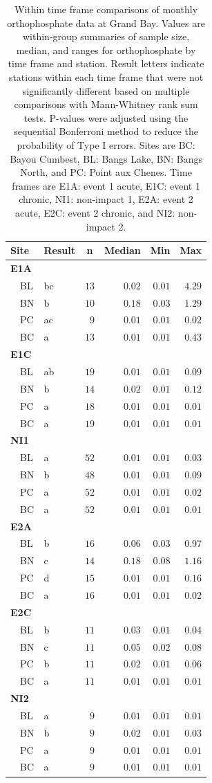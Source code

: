 \documentclass[letterpaper,12pt]{article}\usepackage[]{graphicx}\usepackage[]{color}
\begin{document}
\clearpage

\begin{table}[!tbp]
\caption{Within time frame comparisons of monthly orthophosphate data at Grand Bay.  Values are within-group summaries of sample size, median, and ranges for orthophosphate by time frame and station.  Result letters indicate stations within each time frame that were not significantly different based on multiple comparisons with Mann-Whitney rank sum tests.  P-values were adjusted using the sequential Bonferroni method to reduce the probability of Type I errors. Sites are BC: Bayou Cumbest, BL: Bangs Lake, BN: Bangs North, and PC: Point aux Chenes.  Time frames are E1A: event 1 acute, E1C: event 1 chronic, NI1: non-impact 1, E2A: event 2 acute, E2C: event 2 chronic, and NI2: non-impact 2.\label{tab:orthtab2}} 
\begin{center}
\begin{tabular}{llrrrr}
\hline\hline
\multicolumn{1}{l}{Site}&\multicolumn{1}{c}{Result}&\multicolumn{1}{c}{n}&\multicolumn{1}{c}{Median}&\multicolumn{1}{c}{Min}&\multicolumn{1}{c}{Max}\tabularnewline
\hline
{\bfseries E1A}&&&&&\tabularnewline
~~BL&bc&$13$&$0.02$&$0.01$&$4.29$\tabularnewline
~~BN&b&$10$&$0.18$&$0.03$&$1.29$\tabularnewline
~~PC&ac&$ 9$&$0.01$&$0.01$&$0.02$\tabularnewline
~~BC&a&$13$&$0.01$&$0.01$&$0.43$\tabularnewline
\hline
{\bfseries E1C}&&&&&\tabularnewline
~~BL&ab&$19$&$0.01$&$0.01$&$0.09$\tabularnewline
~~BN&b&$14$&$0.02$&$0.01$&$0.12$\tabularnewline
~~PC&a&$18$&$0.01$&$0.01$&$0.01$\tabularnewline
~~BC&a&$19$&$0.01$&$0.01$&$0.01$\tabularnewline
\hline
{\bfseries NI1}&&&&&\tabularnewline
~~BL&a&$52$&$0.01$&$0.01$&$0.03$\tabularnewline
~~BN&b&$48$&$0.01$&$0.01$&$0.09$\tabularnewline
~~PC&a&$52$&$0.01$&$0.01$&$0.02$\tabularnewline
~~BC&a&$52$&$0.01$&$0.01$&$0.01$\tabularnewline
\hline
{\bfseries E2A}&&&&&\tabularnewline
~~BL&b&$16$&$0.06$&$0.03$&$0.97$\tabularnewline
~~BN&c&$14$&$0.18$&$0.08$&$1.16$\tabularnewline
~~PC&d&$15$&$0.01$&$0.01$&$0.16$\tabularnewline
~~BC&a&$16$&$0.01$&$0.01$&$0.02$\tabularnewline
\hline
{\bfseries E2C}&&&&&\tabularnewline
~~BL&b&$11$&$0.03$&$0.01$&$0.04$\tabularnewline
~~BN&c&$11$&$0.05$&$0.02$&$0.08$\tabularnewline
~~PC&b&$11$&$0.02$&$0.01$&$0.06$\tabularnewline
~~BC&a&$11$&$0.01$&$0.01$&$0.01$\tabularnewline
\hline
{\bfseries NI2}&&&&&\tabularnewline
~~BL&a&$ 9$&$0.01$&$0.01$&$0.01$\tabularnewline
~~BN&b&$ 9$&$0.02$&$0.01$&$0.03$\tabularnewline
~~PC&a&$ 9$&$0.01$&$0.01$&$0.01$\tabularnewline
~~BC&a&$ 9$&$0.01$&$0.01$&$0.01$\tabularnewline
\hline
\end{tabular}\end{center}

\end{table}
\end{document}
